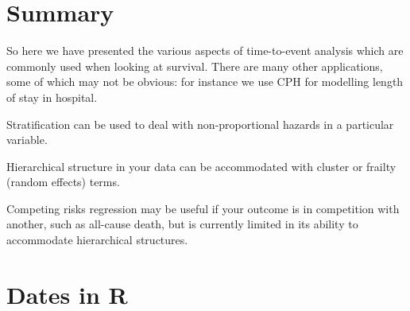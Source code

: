 \documentclass[
  12pt,
  krantz2]{krantz}
\begin{document}
\begin{table}[!h]

\caption{\label{tab:unnamed-chunk-26}Cox Proportional Hazards and competing risks regression combined.}
\centering
{}
\end{table}

\hypertarget{summary-2}{%
\section{Summary}\label{summary-2}}

So here we have presented the various aspects of time-to-event analysis which are commonly used when looking at survival.
There are many other applications, some of which may not be obvious: for instance we use CPH for modelling length of stay in hospital.

Stratification can be used to deal with non-proportional hazards in a particular variable.

Hierarchical structure in your data can be accommodated with cluster or frailty (random effects) terms.

Competing risks regression may be useful if your outcome is in competition with another, such as all-cause death, but is currently limited in its ability to accommodate hierarchical structures.

\hypertarget{dates-in-r}{%
\section{Dates in R}\label{dates-in-r}}
\end{document}
